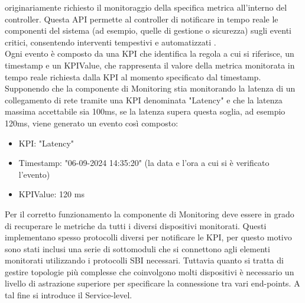 originariamente richiesto il monitoraggio della specifica metrica all'interno del controller.
Questa API permette al controller di notificare in tempo reale le componenti del sistema (ad esempio, quelle di gestione o sicurezza) sugli eventi critici, consentendo interventi tempestivi e automatizzati \cite{D32}.
\\Ogni evento è composto da una KPI che identifica la regola a cui si riferisce, un timestamp e un KPIValue, che rappresenta il valore della metrica monitorata in tempo reale richiesta dalla KPI al momento specificato dal timestamp.
Supponendo che la componente di Monitoring stia monitorando la latenza di un collegamento di rete tramite una KPI denominata "Latency" e che la latenza massima accettabile sia 100ms,
se la latenza supera questa soglia, ad esempio 120ms, viene generato un evento così composto: 
\begin{itemize}
    \item KPI: "Latency"
    \item Timestamp: "06-09-2024 14:35:20" (la data e l'ora a cui si è verificato l'evento)
    \item KPIValue: 120 ms
\end{itemize}
Per il corretto funzionamento la componente di Monitoring deve essere in grado di recuperare le metriche da tutti i diversi dispositivi monitorati.
Questi implementano spesso protocolli diversi per notificare le KPI, per questo motivo sono stati inclusi una serie di sottomoduli che si connettono 
agli elementi monitorati utilizzando i protocolli SBI necessari. %
Tuttavia quanto si tratta di gestire topologie più complesse che coinvolgono molti dispositivi è necessario un livello di astrazione superiore per specificare la connessione tra vari end-points. A tal fine si introduce il Service-level. 

